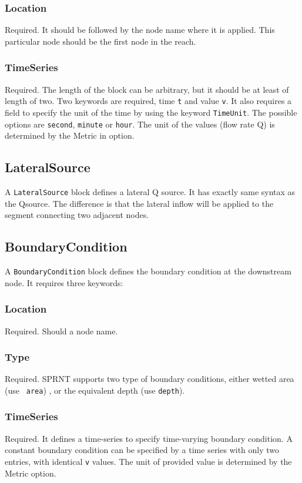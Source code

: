 \documentclass[10pt, letterpaper]{article}
\begin{document}
\subsubsection{Location}
\label{subsubsec:location1}
Required. It should be followed by the node name where it is applied. This particular node
should be the first node in the reach.

\subsubsection{TimeSeries}
\label{subsubsec:ts} 
Required. The length of the block can be arbitrary, but it
should be at least of length of two. Two keywords are required, time {\tt t}
and value {\tt v}. It also requires a field to specify the unit of
the time by using the keyword {\tt TimeUnit}. The possible options are {\tt second},
{\tt minute} or {\tt hour}. The unit of the values (flow rate Q) is determined by the
Metric in option.

\subsection{LateralSource}
\label{subsec:lsources}
A {\tt LateralSource} block defines a lateral Q source. It has exactly same syntax as the
Qsource. The difference is that the lateral inflow will be applied to the segment
connecting two adjacent nodes.

\subsection{BoundaryCondition}
\label{subsec:bcondition}
A {\tt BoundaryCondition} block defines the boundary condition at the downstream
node. It requires three keywords:

\subsubsection{Location}
\label{subsubsec:location2}
Required. Should a node name.

\subsubsection{Type}
\label{subsubsec:type}
Required. SPRNT supports two type of boundary conditions, either wetted area (use {\tt
area}) , or the equivalent depth (use {\tt depth}).

\subsubsection{TimeSeries}
\label{subsubsec:ts2} 
Required. It defines a time-series to specify time-varying boundary condition. A constant boundary
condition can be specified by a time series with only two entries, with identical {\tt v} values. The
unit of provided value is determined by the Metric option.
\end{document}
